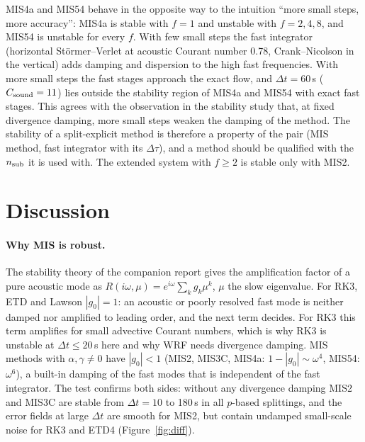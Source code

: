 \documentclass[11pt,a4paper]{article}
\newcommand{\dt}{\Delta t}
\begin{document}
MIS4a and MIS54 behave in the opposite way to the intuition ``more small steps, more accuracy'':
MIS4a is stable with $f=1$ and unstable with $f=2,4,8$, and MIS54 is unstable for every $f$. With
few small steps the fast integrator (horizontal Störmer--Verlet at acoustic Courant number 0.78,
Crank--Nicolson in the vertical) adds damping and dispersion to the high fast frequencies. With
more small steps the fast stages approach the exact flow, and $\dt=60$\,s ($C_{\rm sound}=11$) lies
outside the stability region of MIS4a and MIS54 with exact fast stages. This agrees with the
observation in the stability study that, at fixed divergence damping, more small steps weaken the
damping of the method. The stability of a split-explicit method is therefore a property of the pair
(MIS method, fast integrator with its $\Delta\tau$), and a method should be qualified with the
$n_{\rm sub}$ it is used with. The extended system with $f\ge2$ is stable only with MIS2.

\section{Discussion}
\paragraph{Why MIS is robust.} The stability theory of the companion report gives the amplification
factor of a pure acoustic mode as $R(i\omega,\mu)=e^{i\omega}\sum_kg_k\mu^k$, $\mu$ the slow eigenvalue.
For RK3, ETD and Lawson $|g_0|=1$: an acoustic or poorly resolved fast mode is neither damped nor
amplified to leading order, and the next term decides. For RK3 this term amplifies for small advective
Courant numbers, which is why RK3 is unstable at $\dt\le20$\,s here and why WRF needs divergence
damping. MIS methods with $\alpha,\gamma\ne0$ have $|g_0|<1$ (MIS2, MIS3C, MIS4a: $1-|g_0|\sim\omega^4$,
MIS54: $\omega^6$), a built-in damping of the fast modes that is independent of the fast integrator.
The test confirms both sides: without any divergence damping MIS2 and MIS3C are stable from
$\dt=10$ to 180\,s in all $p$-based splittings, and the error fields at large $\dt$ are smooth for
MIS2, but contain undamped small-scale noise for RK3 and ETD4 (Figure~\ref{fig:diff}).
\end{document}
